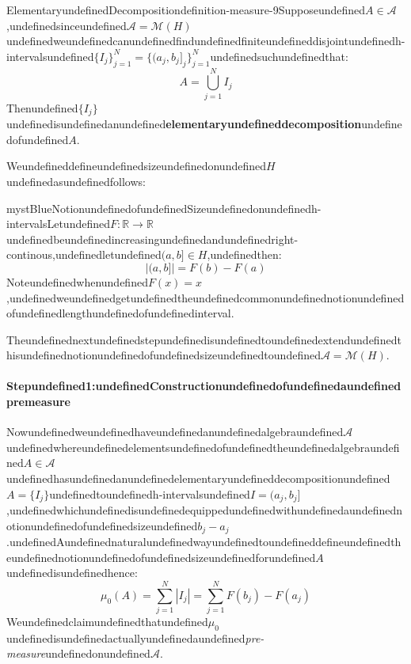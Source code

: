 \begin{mystthmdefinition}{ElementaryundefinedDecomposition}{definition-measure-9}Supposeundefined$A\in \mathcal A$,undefinedsinceundefined$\mathcal A=\mathcal M(H)$undefinedweundefinedcanundefinedfindundefinedfiniteundefineddisjointundefinedh-intervalsundefined$\{I_j\}_{j=1}^N=\{(a_j,b_j]_j\}_{j=1}^N$undefinedsuchundefinedthat:
\begin{equation}
A=\bigcup_{j=1}^N I_j
\end{equation}
Thenundefined$\{I_j\}$undefinedisundefinedanundefined\textbf{elementaryundefineddecomposition}undefinedofundefined$A$.

\end{mystthmdefinition}
Weundefineddefineundefinedsizeundefinedonundefined$H$undefinedasundefinedfollows:

\begin{mystadmonition}{mystBlue}{NotionundefinedofundefinedSizeundefinedonundefinedh-intervals}Letundefined$F:\mathbb{R}\to\mathbb{R}$undefinedbeundefinedincreasingundefinedandundefinedright-continous,undefinedletundefined$(a,b]\in H$,undefinedthen:
\begin{equation}
|(a,b]|=F(b)-F(a)
\end{equation}
Noteundefinedwhenundefined$F(x)=x$,undefinedweundefinedgetundefinedtheundefinedcommonundefinednotionundefinedofundefinedlengthundefinedofundefinedinterval.

\end{mystadmonition}
Theundefinednextundefinedstepundefinedisundefinedtoundefinedextendundefinedthisundefinednotionundefinedofundefinedsizeundefinedtoundefined$\mathcal A=\mathcal M(H)$.

\paragraph{Stepundefined1:undefinedConstructionundefinedofundefinedaundefinedpremeasure}

Nowundefinedweundefinedhaveundefinedanundefinedalgebraundefined$\mathcal A$undefinedwhereundefinedelementsundefinedofundefinedtheundefinedalgebraundefined$A\in \mathcal A$undefinedhasundefinedanundefinedelementaryundefineddecompositionundefined$A=\{I_j\}$undefinedtoundefinedh-intervalsundefined$I=(a_j,b_j]$,undefinedwhichundefinedisundefinedequippedundefinedwithundefinedaundefinednotionundefinedofundefinedsizeundefined$b_j -a_j$.undefinedAundefinednaturalundefinedwayundefinedtoundefineddefineundefinedtheundefinednotionundefinedofundefinedsizeundefinedforundefined$A$undefinedisundefinedhence:
\begin{equation}
\mu_0(A) = \sum_{j=1}^N |I_j| =\sum_{j=1}^N F(b_j)-F(a_j)
\end{equation}
Weundefinedclaimundefinedthatundefined$\mu_0$undefinedisundefinedactuallyundefinedaundefined\textit{pre-measure}undefinedonundefined$\mathcal A$.

